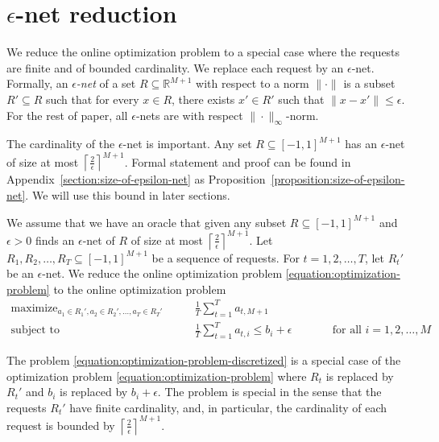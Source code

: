 \documentclass[12pt]{article}
\newcommand{\R}{\mathbb{R}}
\DeclareMathOperator*{\maximize}{maximize}
\DeclareMathOperator*{\subjectto}{subject\ to}
\theoremstyle{definition}
\begin{document}
\section{$\epsilon$-net reduction}
\label{section:epsilon-net-reduction}

We reduce the online optimization problem to a special case where the requests
are finite and of bounded cardinality. We replace each request by an
$\epsilon$-net. Formally, an \emph{$\epsilon$-net} of a set $R \subseteq
\R^{M+1}$ with respect to a norm $\|\cdot\|$ is a subset $R' \subseteq R$ such
that for every $x \in R$, there exists $x' \in R'$ such that $\|x - x'\| \le
\epsilon$. For the rest of paper, all $\epsilon$-nets are with respect
$\|\cdot\|_\infty$-norm.

The cardinality of the $\epsilon$-net is important. Any set $R \subseteq
[-1,1]^{M+1}$ has an $\epsilon$-net of size at most $\left\lceil
\frac{2}{\epsilon} \right\rceil^{M+1}$. Formal statement and proof can be found
in Appendix~\ref{section:size-of-epsilon-net} as
Proposition~\ref{proposition:size-of-epsilon-net}. We will use this bound in
later sections.

We assume that we have an oracle that given any subset $R \subseteq
[-1,1]^{M+1}$ and $\epsilon > 0$ finds an $\epsilon$-net of $R$ of size at most
$\left\lceil \frac{2}{\epsilon} \right\rceil^{M+1}$. Let $R_1, R_2, \dots, R_T
\subseteq [-1,1]^{M+1}$ be a sequence of requests. For $t=1,2,\dots,T$, let
$R_t'$ be an $\epsilon$-net. We reduce the online optimization problem
\eqref{equation:optimization-problem} to the online optimization problem
\begin{equation}
\label{equation:optimization-problem-discretized}
\begin{aligned}
\maximize_{a_1 \in R_1', a_2 \in R_2', \dots, a_T \in R_T'} \qquad & \frac{1}{T} \sum_{t=1}^T a_{t,M+1} \\
\subjectto \qquad & \frac{1}{T} \sum_{t=1}^T a_{t,i} \le b_i + \epsilon && \qquad \text{for all $i=1,2,\dots,M$}
\end{aligned}
\end{equation}

The problem \eqref{equation:optimization-problem-discretized} is a special case
of the optimization problem \eqref{equation:optimization-problem} where $R_t$ is
replaced by $R_t'$ and $b_i$ is replaced by $b_i + \epsilon$. The problem is
special in the sense that the requests $R_t'$ have finite cardinality, and, in
particular, the cardinality of each request is bounded by $\left\lceil
\frac{2}{\epsilon} \right\rceil^{M+1}$.
\end{document}
